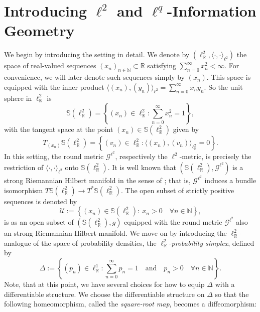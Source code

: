 \documentclass[runningheads]{llncs}
\def\NN{\mathbb{N}}
\def\RR{\mathbb{R}}
\def\Slr{\mathbb{S}\left(\ell_{\RR}^2 \right)}
\def\U{\mathcal{U}}
\def\Glt{\mathcal{G}^{\ell^2}}
\begin{document}
\section{Introducing $\ell^2$ and $\ell^q$-Information Geometry}\label{s: 2}
We begin by introducing the setting in detail. We denote by $\left(\ell^2_\mathbb{R}, \langle\cdot, \cdot\rangle_{\ell^2}\right)$ the space of real-valued sequences $(x_n)_{n\in \mathbb{N}} \subset \mathbb{R}$ satisfying $\sum_{n=0}^{\infty} x_n^2 < \infty.$
For convenience, we will later denote such sequences simply by $(x_n)$. This space is equipped with the inner product $\langle (x_n), (y_n)\rangle_{\ell^2} = \sum_{n=0}^{\infty} x_n y_n.$
So the unit sphere in $\ell^2_{\mathbb{R}}$ is 
\[
\mathbb{S}\left(\ell^2_{\mathbb{R}} \right)=\left\{(x_n)\in \ell_{\mathbb{R}}^2 : \sum_{n=0}^{\infty} x_n^2 = 1 \right\},
\]
with the tangent space at the point $(x_n) \in \mathbb{S}(\ell^2_{\mathbb{R}})$ given by
\[
T_{(x_n)} \mathbb{S}(\ell^2_{\mathbb{R}}) = \left\{(v_n) \in \ell_{\mathbb{R}}^2 : \langle (x_n), (v_n) \rangle_{\ell^2_{\mathbb{R}}} = 0 \right\}.
\]
In this setting, the round metric $\Glt$, respectively the $\ell^2$-metric, is precisely the restriction of $\langle\cdot, \cdot \rangle_{\ell^2}$ onto $\mathbb{S}(\ell^2_{\mathbb{R}})$. It is well known that \( (\mathbb{S}(\ell^2_{\mathbb{R}}), \Glt) \) is a strong Riemannian Hilbert manifold in the sense of \cite{LA99}; that is, \( \Glt \) induces a bundle isomorphism 
\(T\mathbb{S}(\ell^2_{\mathbb{R}}) \rightarrow T^*\mathbb{S}(\ell^2_{\mathbb{R}})\).
The open subset of strictly positive sequences is denoted by 
\begin{equation}\label{e: definition Ul2 }
	\U:=\left\{(x_n)\in \Slr:\  x_n>0 \quad \forall n\in \NN\right\},
\end{equation}
is as an open subset of $(\mathbb{S}(\ell^2_{\mathbb{R}}), g)$ equipped with the round metric $\Glt$ also an strong Riemannian Hilbert manifold. 
We move on by introducing the $\ell^2_{\mathbb{R}}$-analogue of the space of probability densities, the $\ell^2_{\mathbb{R}}$-\emph{probability simplex}, defined by 
\begin{equation}\label{e: definition l2probability simplex}
	\Delta := \left\{(p_n) \in \ell^1_{\mathbb{R}} : \sum_{n=0}^{\infty} p_n = 1 \quad \text{and} \quad p_n > 0 \quad \forall n \in \mathbb{N} \right\}.
\end{equation}
Note, that at this point, we have several choices for how to equip $\Delta$ with a differentiable structure. We choose the differentiable structure on $\Delta$ so that the following homeomorphism, called the \emph{square-root map}, becomes a diffeomorphism:
\end{document}

